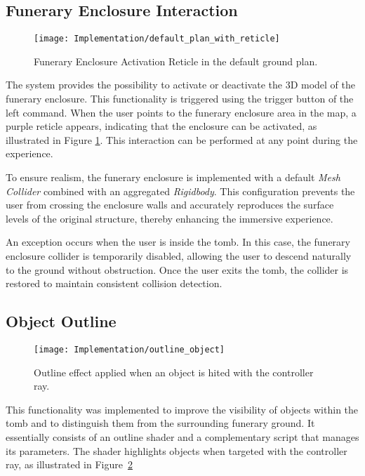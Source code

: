 \subsection*{Funerary Enclosure Interaction}
 \begin{figure}[h!]
    \centering
    \texttt{[image: Implementation/default\_plan\_with\_reticle]}
    \caption{Funerary Enclosure Activation Reticle in the default ground plan.}
    \label{fig:funerary_interaction}    
\end{figure}

The system provides the possibility to activate or deactivate the \gls{3D} model of the funerary enclosure.
This functionality is triggered using the trigger button of the left command. When the user points to the funerary enclosure area in the map, a purple reticle appears, indicating that the enclosure can be activated, as illustrated in Figure \ref{fig:funerary_interaction}. This interaction can be performed at any point during the experience.

To ensure realism, the funerary enclosure is implemented with a default \emph{Mesh Collider} combined with an aggregated \emph{Rigidbody}. This configuration prevents the user from crossing the enclosure walls and accurately reproduces the surface levels of the original structure, thereby enhancing the immersive experience.

An exception occurs when the user is inside the tomb. In this case, the funerary enclosure collider is temporarily disabled, allowing the user to descend naturally to the ground without obstruction. Once the user exits the tomb, the collider is restored to maintain consistent collision detection.

\subsection*{Object Outline}
 \begin{figure}[h!]
    \centering
    \texttt{[image: Implementation/outline\_object]}
    \caption{Outline effect applied when an object is hited with the controller ray.}
    \label{fig:outline_object}    
\end{figure}


This functionality was implemented to improve the visibility of objects within the tomb and to distinguish them from the surrounding funerary ground.  
It essentially consists of an outline shader and a complementary script that manages its parameters. 
The shader highlights objects when targeted with the controller ray, as illustrated in Figure~\ref{fig:outline_object}

